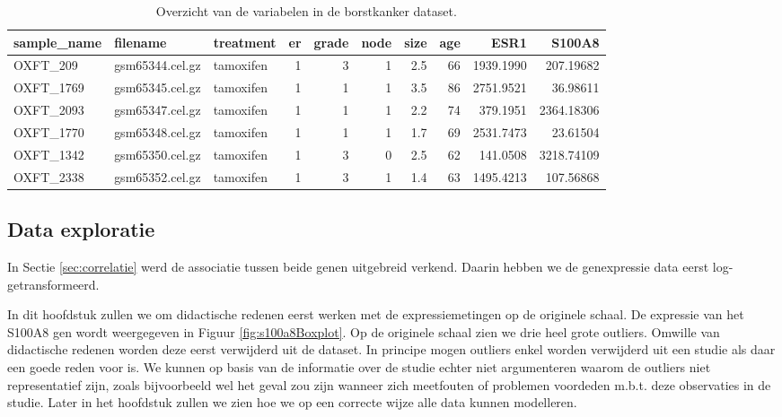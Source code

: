 \documentclass[
  12pt,dutch,coursenotes]{book}
\begin{document}
\begin{table}

\caption{\label{tab:brcaMicroLin}Overzicht van de variabelen in de borstkanker dataset.}
\centering
\begin{tabular}[t]{lllrrrrrrr}
\toprule
sample\_name & filename & treatment & er & grade & node & size & age & ESR1 & S100A8\\
\midrule
OXFT\_209 & gsm65344.cel.gz & tamoxifen & 1 & 3 & 1 & 2.5 & 66 & 1939.1990 & 207.19682\\
OXFT\_1769 & gsm65345.cel.gz & tamoxifen & 1 & 1 & 1 & 3.5 & 86 & 2751.9521 & 36.98611\\
OXFT\_2093 & gsm65347.cel.gz & tamoxifen & 1 & 1 & 1 & 2.2 & 74 & 379.1951 & 2364.18306\\
OXFT\_1770 & gsm65348.cel.gz & tamoxifen & 1 & 1 & 1 & 1.7 & 69 & 2531.7473 & 23.61504\\
OXFT\_1342 & gsm65350.cel.gz & tamoxifen & 1 & 3 & 0 & 2.5 & 62 & 141.0508 & 3218.74109\\
\addlinespace
OXFT\_2338 & gsm65352.cel.gz & tamoxifen & 1 & 3 & 1 & 1.4 & 63 & 1495.4213 & 107.56868\\
\bottomrule
\end{tabular}
\end{table}

\hypertarget{data-exploratie}{%
\subsection{Data exploratie}\label{data-exploratie}}

In Sectie \ref{sec:correlatie} werd de associatie tussen beide genen uitgebreid verkend. Daarin hebben we de genexpressie data eerst log-getransformeerd.

In dit hoofdstuk zullen we om didactische redenen eerst werken met de expressiemetingen op de originele schaal.
De expressie van het S100A8 gen wordt weergegeven in Figuur \ref{fig:s100a8Boxplot}. Op de originele schaal zien we drie heel grote outliers. Omwille van didactische redenen worden deze eerst verwijderd uit de dataset. In principe mogen outliers enkel worden verwijderd uit een studie als daar een goede reden voor is. We kunnen op basis van de informatie over de studie echter niet argumenteren waarom de outliers niet representatief zijn, zoals bijvoorbeeld wel het geval zou zijn wanneer zich meetfouten of problemen voordeden m.b.t. deze observaties in de studie. Later in het hoofdstuk zullen we zien hoe we op een correcte wijze alle data kunnen modelleren.
\end{document}

